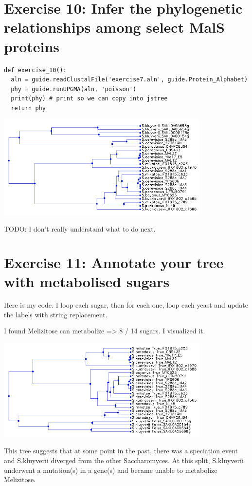 \documentclass{article} %
\begin{document}
\section{Exercise 10: Infer the phylogenetic relationships among select MalS proteins}

\begin{verbatim}
def exercise_10():
  aln = guide.readClustalFile('exercise7.aln', guide.Protein_Alphabet)
  phy = guide.runUPGMA(aln, 'poisson')
  print(phy) # print so we can copy into jstree 
  return phy
\end{verbatim}

\includegraphics[width=0.8\textwidth]{tree.png}

TODO: I don't really understand what to do next.

\section{Exercise 11: Annotate your tree with metabolised sugars}

Here is my code. I loop each sugar, then for each one, loop each yeast and update the labels with string replacement.


I found Melizitose can metabolize => 8 / 14 sugars. I visualized it.

\includegraphics[width=0.8\textwidth]{tree2.png}

This tree suggests that at some point in the past, there was a speciation event and S.kluyverii diverged from the other Saccharomyces. At this split, S.kluyverii underwent a mutation(s) in a gene(s) and became unable to metabolize Melizitose.
\end{document}
